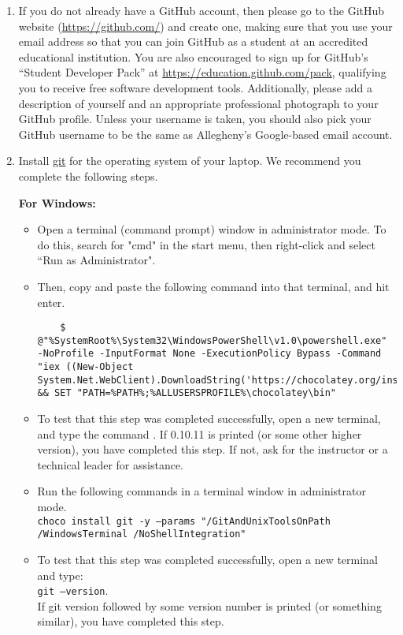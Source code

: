 \begin{enumerate}

  \item If you do not already have a GitHub account, then please go to the GitHub website (\url{https://github.com/}) and create one, making sure
    that you use your  email address so that you can join GitHub as a student at an accredited
    educational institution. You are also encouraged to sign up for GitHub's ``Student Developer Pack'' at
    \url{https://education.github.com/pack}, qualifying you to receive free software development tools. Additionally,
    please add a description of yourself and an appropriate professional photograph to your GitHub profile. Unless your
    username is taken, you should also pick your GitHub username to be the same as Allegheny's Google-based email
    account. 
  
  \item Install \href{https://git-scm.com/downloads}{git} for the operating system of your laptop. We recommend you complete the following steps.
  
  \textbf{For Windows:} 
  \begin{itemize}
  	\item Open a terminal (command prompt) window in administrator mode. To do this, search for "cmd" in the start menu, then right-click and select ``Run as Administrator". 
  	\item Then, copy and paste the following command into that terminal, and hit enter.   
  	\begin{verbatim}
  	$ @"%SystemRoot%\System32\WindowsPowerShell\v1.0\powershell.exe" -NoProfile -InputFormat None -ExecutionPolicy Bypass -Command "iex ((New-Object System.Net.WebClient).DownloadString('https://chocolatey.org/install.ps1'))" && SET "PATH=%PATH%;%ALLUSERSPROFILE%\chocolatey\bin"
  	\end{verbatim}
	\item To test that this step was completed successfully, open a new terminal, and type the command . If 0.10.11 is printed (or some other higher version), you have completed this step. If not, ask for the instructor or a technical leader for assistance.
	\item Run the following commands in a terminal window in administrator mode. \\
	{\tt choco install git -y --params "/GitAndUnixToolsOnPath} \\
	{\tt /WindowsTerminal /NoShellIntegration"}
	\item To test that this step was completed successfully, open a new terminal and type: \\ {\tt git --version}. \\
	If git version followed by some version number is printed (or something similar), you have completed this step.
	\end{itemize}
	

\end{enumerate}
